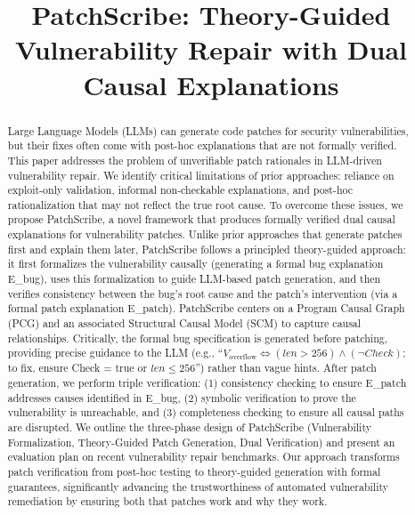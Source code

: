 \documentclass[conference,compsoc]{IEEEtran}
\begin{document}
\title{PatchScribe: Theory-Guided Vulnerability Repair with Dual Causal Explanations}

\author{}
\maketitle
\begin{abstract}
Large Language Models (LLMs) can generate code patches for security
vulnerabilities, but their fixes often come with post-hoc explanations
that are not formally verified. This paper addresses the problem of
unverifiable patch rationales in LLM-driven vulnerability repair. We
identify critical limitations of prior approaches: reliance on
exploit-only validation, informal non-checkable explanations, and
post-hoc rationalization that may not reflect the true root cause. To
overcome these issues, we propose PatchScribe, a novel framework that
produces formally verified dual causal explanations for vulnerability
patches. Unlike prior approaches that generate patches first and explain
them later, PatchScribe follows a principled theory-guided approach: it
first formalizes the vulnerability causally (generating a formal bug
explanation E\_bug), uses this formalization to guide LLM-based patch
generation, and then verifies consistency between the bug's root cause
and the patch's intervention (via a formal patch explanation E\_patch).
PatchScribe centers on a Program Causal Graph (PCG) and an associated
Structural Causal Model (SCM) to capture causal relationships.
Critically, the formal bug specification is generated before patching,
providing precise guidance to the LLM (e.g., ``$V_{\text{overflow}}
\Leftrightarrow (len > 256) \land (\lnot Check)$; to fix, ensure Check =
true or $len \leq 256$'') rather than vague hints. After patch
generation, we perform
triple verification: (1) consistency checking to ensure E\_patch
addresses causes identified in E\_bug, (2) symbolic verification to
prove the vulnerability is unreachable, and (3) completeness checking to
ensure all causal paths are disrupted. We outline the three-phase design
of PatchScribe (Vulnerability Formalization, Theory-Guided Patch
Generation, Dual Verification) and present an evaluation plan on recent
vulnerability repair benchmarks. Our approach transforms patch
verification from post-hoc testing to theory-guided generation with
formal guarantees, significantly advancing the trustworthiness of
automated vulnerability remediation by ensuring both that patches work
and why they work.
\end{abstract}
\end{document}
